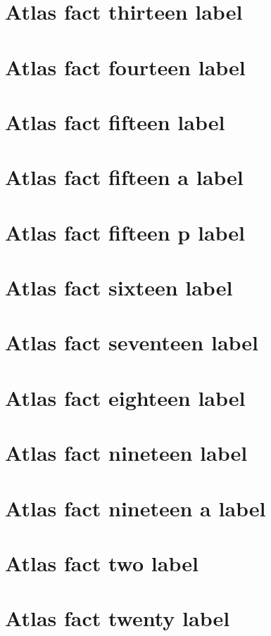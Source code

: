 \documentclass[11pt]{article}
\theoremstyle{definition}
\begin{document}
\section{Atlas fact thirteen label}
\label{ll:labels:atlas-f13}
\section{Atlas fact fourteen label}
\label{ll:labels:atlas-f14}
\section{Atlas fact fifteen label}
\label{ll:labels:atlas-f15}
\section{Atlas fact fifteen a label}
\label{ll:labels:atlas-f15a}
\section{Atlas fact fifteen p label}
\label{ll:labels:atlas-f15p}
\section{Atlas fact sixteen label}
\label{ll:labels:atlas-f16}
\section{Atlas fact seventeen label}
\label{ll:labels:atlas-f17}
\section{Atlas fact eighteen label}
\label{ll:labels:atlas-f18}
\section{Atlas fact nineteen label}
\label{ll:labels:atlas-f19}
\section{Atlas fact nineteen a label}
\label{ll:labels:atlas-f19a}
\section{Atlas fact two label}
\label{ll:labels:atlas-f2}
\section{Atlas fact twenty label}
\label{ll:labels:atlas-f20}
\end{document}
